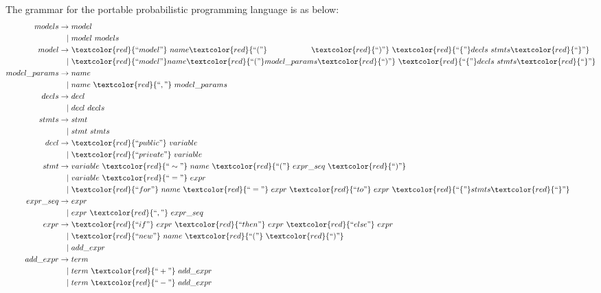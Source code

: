The grammar for the portable probabilistic programming language is as below:
\begin{align*}
           models \rightarrow & ~model \\
                   |& ~model ~models \\       
            model \rightarrow & ~\textcolor{red}{``model"} ~name \textcolor{red}{``("}~~~~~~~~~~~~~~~~~ \textcolor{red}{``)"} ~ \textcolor{red}{``\{"} decls ~stmts \textcolor{red}{``\}"} \\
                   |& ~\textcolor{red}{``model"} name \textcolor{red}{``("} model\_params \textcolor{red}{``)"} ~\textcolor{red}{``\{"} decls ~stmts \textcolor{red}{``\}"} \\         
     model\_params \rightarrow & ~name \\
                   |& ~name ~\textcolor{red}{``,"}~ model\_params \\        
            decls \rightarrow & ~decl \\
                   |& ~decl ~decls \\ 
            stmts \rightarrow & ~stmt \\
                   |& ~stmt ~stmts \\        
             decl \rightarrow & ~\textcolor{red}{``public"} ~variable \\
                   |& ~\textcolor{red}{``private"} ~variable \\         
             stmt \rightarrow & ~variable ~\textcolor{red}{``\sim"} ~name ~\textcolor{red}{``("} ~expr\_seq ~\textcolor{red}{``)"} \\
                   |& ~variable ~\textcolor{red}{``="} ~expr \\
                   |& ~\textcolor{red}{``for"} ~name ~\textcolor{red}{``="} ~expr ~\textcolor{red}{``to"} ~expr ~\textcolor{red}{``\{"} stmts \textcolor{red}{``\}"} \\        
         expr\_seq \rightarrow & ~expr \\
                   |& ~expr ~\textcolor{red}{``,"} ~expr\_seq \\      
             expr \rightarrow & ~\textcolor{red}{``if"} ~expr ~\textcolor{red}{``then"} ~expr ~\textcolor{red}{``else"} ~expr \\
                   |& ~\textcolor{red}{``new"} ~name ~\textcolor{red}{``("} ~\textcolor{red}{``)"} \\
                   |& ~add\_expr \\  
         add\_expr \rightarrow & ~term \\
                   |& ~term ~\textcolor{red}{``+"} ~add\_expr \\
                   |& ~term ~\textcolor{red}{``-"} ~add\_expr     
\end{align*}

